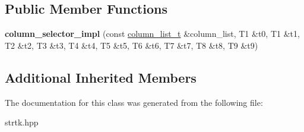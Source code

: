 \subsection*{Public Member Functions}
\begin{DoxyCompactItemize}
\item 
\hypertarget{classstrtk_1_1details_1_1column__selector__impl_3_01T0_00_01T1_00_01T2_00_01T3_00_01T4_00_01T5_043b13d3d6fe5ff73160afdc979d62aa7_ae5f2b9b0fd57487134745b844dd731af}{{\bfseries column\-\_\-selector\-\_\-impl} (const \hyperlink{structstrtk_1_1details_1_1column__list__impl}{column\-\_\-list\-\_\-t} \&column\-\_\-list, T1 \&t0, T1 \&t1, T2 \&t2, T3 \&t3, T4 \&t4, T5 \&t5, T6 \&t6, T7 \&t7, T8 \&t8, T9 \&t9)}\label{classstrtk_1_1details_1_1column__selector__impl_3_01T0_00_01T1_00_01T2_00_01T3_00_01T4_00_01T5_043b13d3d6fe5ff73160afdc979d62aa7_ae5f2b9b0fd57487134745b844dd731af}

\end{DoxyCompactItemize}
\subsection*{Additional Inherited Members}


The documentation for this class was generated from the following file\-:\begin{DoxyCompactItemize}
\item 
strtk.\-hpp\end{DoxyCompactItemize}
